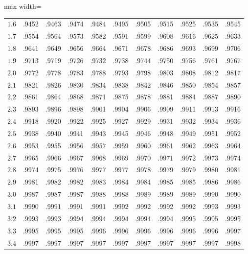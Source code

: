 \begin{center}
\begin{adjustbox}{max width=\linewidth}
\begin{tabular}{ccccccccccc}
$1.6$ & .9452 & .9463 & .9474 & .9484 & .9495 & .9505 & .9515 & .9525 & .9535 & .9545 \\
$1.7$ & .9554 & .9564 & .9573 & .9582 & .9591 & .9599 & .9608 & .9616 & .9625 & .9633 \\
$1.8$ & .9641 & .9649 & .9656 & .9664 & .9671 & .9678 & .9686 & .9693 & .9699 & .9706 \\
$1.9$ & .9713 & .9719 & .9726 & .9732 & .9738 & .9744 & .9750 & .9756 & .9761 & .9767 \\
\midrule
$2.0$ & .9772 & .9778 & .9783 & .9788 & .9793 & .9798 & .9803 & .9808 & .9812 & .9817 \\
$2.1$ & .9821 & .9826 & .9830 & .9834 & .9838 & .9842 & .9846 & .9850 & .9854 & .9857 \\
$2.2$ & .9861 & .9864 & .9868 & .9871 & .9875 & .9878 & .9881 & .9884 & .9887 & .9890 \\
$2.3$ & .9893 & .9896 & .9898 & .9901 & .9904 & .9906 & .9909 & .9911 & .9913 & .9916 \\
$2.4$ & .9918 & .9920 & .9922 & .9925 & .9927 & .9929 & .9931 & .9932 & .9934 & .9936 \\
\midrule
$2.5$ & .9938 & .9940 & .9941 & .9943 & .9945 & .9946 & .9948 & .9949 & .9951 & .9952 \\
$2.6$ & .9953 & .9955 & .9956 & .9957 & .9959 & .9960 & .9961 & .9962 & .9963 & .9964 \\
$2.7$ & .9965 & .9966 & .9967 & .9968 & .9969 & .9970 & .9971 & .9972 & .9973 & .9974 \\
$2.8$ & .9974 & .9975 & .9976 & .9977 & .9977 & .9978 & .9979 & .9979 & .9980 & .9981 \\
$2.9$ & .9981 & .9982 & .9982 & .9983 & .9984 & .9984 & .9985 & .9985 & .9986 & .9986 \\
\midrule
$3.0$ & .9987 & .9987 & .9987 & .9988 & .9988 & .9989 & .9989 & .9989 & .9990 & .9990 \\
$3.1$ & .9990 & .9991 & .9991 & .9991 & .9992 & .9992 & .9992 & .9992 & .9993 & .9993 \\
$3.2$ & .9993 & .9993 & .9994 & .9994 & .9994 & .9994 & .9994 & .9995 & .9995 & .9995 \\
$3.3$ & .9995 & .9995 & .9995 & .9996 & .9996 & .9996 & .9996 & .9996 & .9996 & .9997 \\
$3.4$ & .9997 & .9997 & .9997 & .9997 & .9997 & .9997 & .9997 & .9997 & .9997 & .9998 \\
\bottomrule
\end{tabular}
\end{adjustbox}
\end{center}

